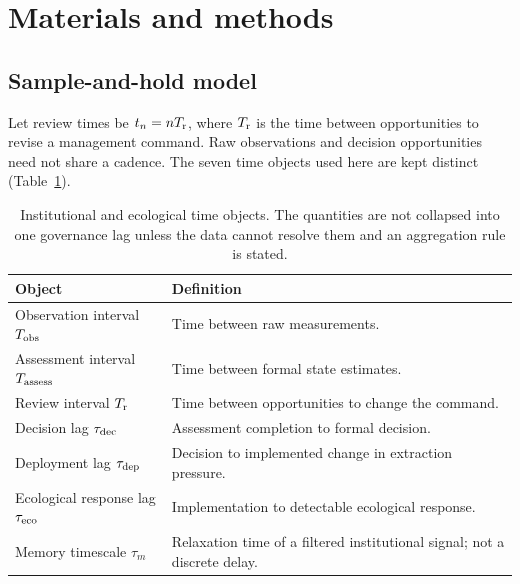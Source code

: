 \section{Materials and methods}\label{sec:methods}

\subsection{Sample-and-hold model}\label{sec:model}

Let review times be \(t_n=nT_{\mathrm r}\), where \(T_{\mathrm r}\) is the time between opportunities to revise a management command. Raw observations and decision opportunities need not share a cadence. The seven time objects used here are kept distinct (Table~\ref{tab:clocks}).

\begin{table}[htbp]
\centering\small
\caption{Institutional and ecological time objects. The quantities are not collapsed into one governance lag unless the data cannot resolve them and an aggregation rule is stated.}
\label{tab:clocks}
\begin{tabularx}{\linewidth}{@{}lX@{}}
\toprule
Object & Definition \\
\midrule
Observation interval \(T_{\rm obs}\) & Time between raw measurements. \\
Assessment interval \(T_{\rm assess}\) & Time between formal state estimates. \\
Review interval \(T_{\mathrm r}\) & Time between opportunities to change the command. \\
Decision lag \(\tau_{\rm dec}\) & Assessment completion to formal decision. \\
Deployment lag \(\tau_{\rm dep}\) & Decision to implemented change in extraction pressure. \\
Ecological response lag \(\tau_{\rm eco}\) & Implementation to detectable ecological response. \\
Memory timescale \(\tau_m\) & Relaxation time of a filtered institutional signal; not a discrete delay. \\
\bottomrule
\end{tabularx}
\end{table}

